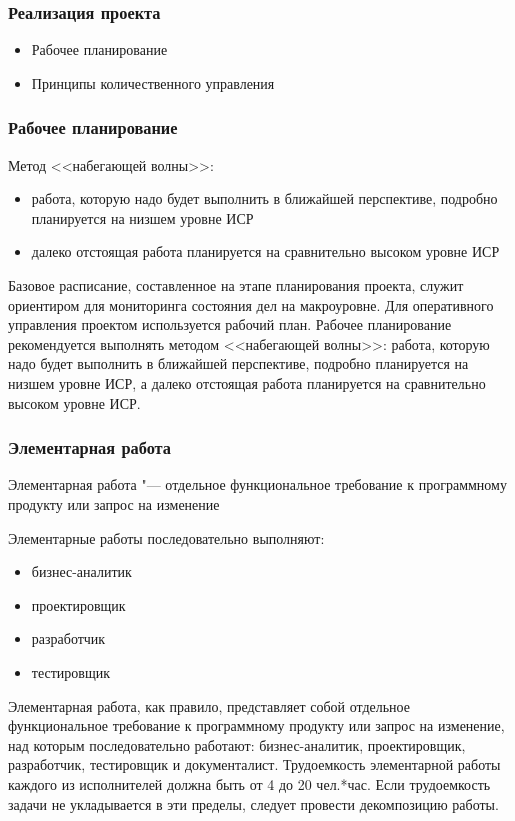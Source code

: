 \documentclass{../industrial-development}
\begin{document}
    \begin{frame} \frametitle{Реализация проекта}
        \begin{itemize}
            \item Рабочее планирование
            \item Принципы количественного управления
        \end{itemize}
    \end{frame}
    \lecturenotes

    \begin{frame} \frametitle{Рабочее планирование}
        Метод <<набегающей волны>>:
        \begin{itemize}
            \item работа, которую надо будет выполнить в ближайшей перспективе, подробно планируется на низшем уровне ИСР
            \item далеко отстоящая работа планируется на сравнительно высоком уровне ИСР
        \end{itemize}
    \end{frame}
    \lecturenotes
    Базовое расписание, составленное на этапе планирования проекта, служит ориентиром для мониторинга состояния дел на макроуровне. Для оперативного управления проектом используется рабочий план. Рабочее планирование рекомендуется выполнять методом <<набегающей волны>>: работа, которую надо будет выполнить в ближайшей перспективе, подробно планируется на низшем уровне ИСР, а далеко отстоящая работа планируется на сравнительно высоком уровне ИСР.

    \begin{frame} \frametitle{Элементарная работа}
        \begin{definition}
            \alert{Элементарная работа} "--- отдельное функциональное требование к программному продукту или запрос на изменение
        \end{definition}
        Элементарные работы последовательно выполняют:
        \begin{itemize}
            \item бизнес-аналитик
            \item проектировщик
            \item разработчик
            \item тестировщик
        \end{itemize}
    \end{frame}
    \lecturenotes
    Элементарная работа, как правило, представляет собой отдельное функциональное требование к программному продукту или запрос на изменение, над которым последовательно работают: бизнес-аналитик, проектировщик, разработчик, тестировщик и документалист. Трудоемкость элементарной работы каждого из исполнителей должна быть от 4 до 20 чел.*час. Если трудоемкость задачи не укладывается в эти пределы, следует провести декомпозицию работы. 
\end{document}
